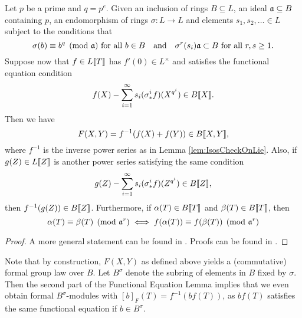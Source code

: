 \documentclass[../main.tex]{subfiles}
\begin{document}
\begin{thm}\label{thm:HazewinkelIntegrality}
  Let $p$ be a prime and $q = p^e$. Given an inclusion of rings $B \subseteq
  L$, an ideal $\mathfrak{a} \subseteq B$ containing $p$, an endomorphism of rings
  $\sigma\colon  L \to L$ and elements $s_1, s_2, \dots \in L$ subject to the conditions
  that 
  \begin{equation*}
    \sigma(b) \equiv b^q \pmod {\mathfrak{a}} \text{ for all } b \in B \quad \text{and} \quad 
    \sigma^r(s_i) \mathfrak{a} \subset B \text{ for all } r,s \geq 1.
  \end{equation*}
  Suppose now that $f \in L\llbracket T \rrbracket$ has $f'(0) \in L^\times$ and
  satisfies the functional equation condition
  \begin{equation*}
    f(X) - \sum_{i=1}^\infty s_i (\sigma^i_* f)(X^{q^i}) \in B\llbracket X \rrbracket.
  \end{equation*}
  Then we have 
  \begin{equation*}
    F(X,Y) = f^{-1}(f(X) + f(Y)) \in B \llbracket X,Y \rrbracket,
  \end{equation*}
  where $f^{-1}$ is the inverse power series as in Lemma \ref{lem:IsosCheckOnLie}.
  Also, if $g(Z) \in L\llbracket Z \rrbracket$ is another power series satisfying the 
  same condition
  \begin{equation*}
    g(Z) - \sum_{i=1}^\infty s_i (\sigma^i_* f)(Z^{q^i}) \in B\llbracket Z \rrbracket,
  \end{equation*}
  then $f^{-1}(g(Z)) \in B\llbracket Z \rrbracket$. 
  Furthermore, if $\alpha(T) \in B\llbracket T \rrbracket$ and $\beta(T) \in B \llbracket T \rrbracket$, then
  \begin{equation} \label{eq:funceqlemcongruence}
    \alpha(T) \equiv \beta(T) \pmod {\mathfrak{a}^r} \iff f(\alpha(T)) \equiv f(\beta(T))
    \pmod {\mathfrak{a}^r}
  \end{equation}

  \begin{proof}
    A more general statement can be found in \cite[Section
    2]{hazewinkel1979funceqexp}. Proofs can be found in \cite[Sections 2 and
    10]{hazewinkel1978formal}.
  \end{proof}
\end{thm}
Note that by construction, $F(X,Y)$ as defined above yields a (commutative)
formal group law over $B$. 
Let $B^\sigma$ denote the subring of elements in $B$ fixed by $\sigma$. Then 
the second part of the Functional Equation Lemma implies that we even obtain
formal $B^\sigma$-modules with $[b]_F(T) = f^{-1}(b f(T))$, as $bf(T)$
satisfies the same functional equation if $b \in B^\sigma$. 
\end{document}
